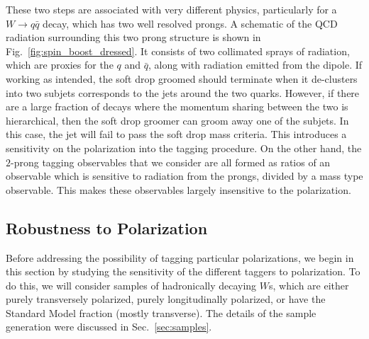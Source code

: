 \documentclass[11pt,letterpaper]{article}
\DeclareRobustCommand{\Sec}[1]{Sec.~\ref{#1}}
\DeclareRobustCommand{\Fig}[1]{Fig.~\ref{#1}}
\begin{document}
These two steps are associated with very different physics, particularly for a $W\to q\bar q$ decay, which has two well resolved prongs. A schematic of the QCD radiation surrounding this two prong structure is shown in \Fig{fig:spin_boost_dressed}. It consists of two collimated sprays of radiation, which are proxies for the $q$ and $\bar q$, along with radiation emitted from the dipole. If working as intended, the soft drop groomed should terminate when it de-clusters into two subjets corresponds to the jets around the two quarks. However, if there are a large fraction of decays where the momentum sharing between the two is hierarchical, then the soft drop groomer can groom away one of the subjets. In this case, the jet will fail to pass the soft drop mass criteria. This introduces a sensitivity on the polarization into the tagging procedure. On the other hand, the $2$-prong tagging observables that we consider are all formed as ratios of an observable which is sensitive to radiation from the prongs, divided by a mass type observable. This makes these observables largely insensitive to the polarization.

\subsection{Robustness to Polarization}\label{sec:polar_robust}

Before addressing the possibility of tagging particular polarizations, we begin in this section by studying the sensitivity of the different taggers to polarization. To do this, we will consider samples of hadronically decaying $W$s, which are either purely transversely polarized, purely longitudinally polarized, or have the Standard Model fraction (mostly transverse). The details of the sample generation were discussed in \Sec{sec:samples}.
\end{document}

